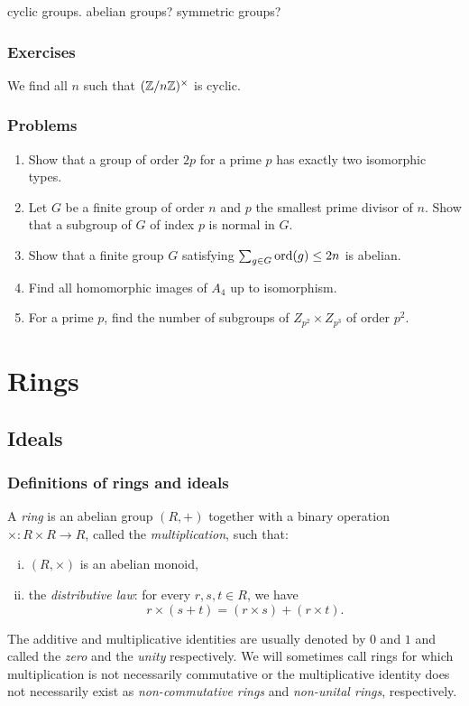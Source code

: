 \documentclass{../note}
\begin{document}
cyclic groups.
abelian groups?
symmetric groups?




\section*{Exercises}

\begin{prb}
We find all $n$ such that $(\mathbb{Z}/n\mathbb{Z})^\times$ is cyclic.
\end{prb}




\section*{Problems}

\begin{enumerate}
\item Show that a group of order $2p$ for a prime $p$ has exactly two isomorphic types.
\item Let $G$ be a finite group of order $n$ and $p$ the smallest prime divisor of $n$. Show that a subgroup of $G$ of index $p$ is normal in $G$.
\item Show that a finite group $G$ satisfying $\sum_{g\in G}\operatorname{ord}(g)\le2n$ is abelian.
\item Find all homomorphic images of $A_4$ up to isomorphism.
\item For a prime $p$, find the number of subgroups of $Z_{p^2}\times Z_{p^3}$ of order $p^2$.
\end{enumerate}







\part{Rings}
\chapter{Ideals}
\section{Definitions of rings and ideals}
\begin{prb}
A \emph{ring} is an abelian group $(R,+)$ together with a binary operation $\times:R\times R\to R$, called the \emph{multiplication}, such that:
\begin{enumerate}[(i)]
\item $(R,\times)$ is an abelian monoid,
\item the \emph{distributive law}: for every $r,s,t\in R$, we have
\[r\times(s+t)=(r\times s)+(r\times t).\]
\end{enumerate}
The additive and multiplicative identities are usually denoted by $0$ and $1$ and called the \emph{zero} and the \emph{unity} respectively.
We will sometimes call rings for which multiplication is not necessarily commutative or the multiplicative identity does not necessarily exist as \emph{non-commutative rings} and \emph{non-unital rings}, respectively.
\end{prb}
\end{document}
